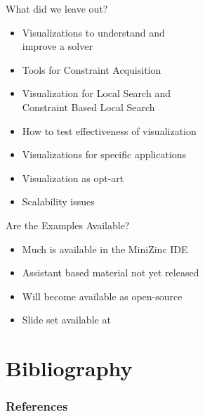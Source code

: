 \begin{frame}{What did we leave out?}
\begin{itemize}
    \item<+-|alert@+> Visualizations to understand and\\ improve a solver
    \item<+-|alert@+> Tools for Constraint Acquisition
    \item<+-|alert@+> Visualization for Local Search and\\ Constraint Based Local Search\\\cite{DBLP:journals/constraints/DoomsHM09}
    \item<+-|alert@+> How to test effectiveness of visualization
    \item<+-|alert@+> Visualizations for specific applications
    \item<+-|alert@+> Visualization as opt-art\\ \cite{DBLP:conf/cpaior/Bosch06,DBLP:journals/anor/CambazardHOO11}
    \item<+-|alert@+> Scalability issues
\end{itemize}    
\end{frame}

\begin{frame}{Are the Examples Available?}
\begin{itemize}
    \item Much is available in the MiniZinc IDE
    \item Assistant based material not yet released
    \item Will become available as open-source
    \item Slide set available at \url{}
\end{itemize}    
\end{frame}


\section{Bibliography}


\nocite{DBLP:conf/discipl/SimonisCDFNT00}
\nocite{DBLP:journals/tvcg/LiuDTGM21}
\nocite{DBLP:journals/tvcg/GoodwinMDBTW17}
\nocite{DBLP:journals/constraints/ShishmarevMTB16}
\nocite{DBLP:conf/ppdp/CameronBMM03}
\nocite{DBLP:conf/cp/Meier95}
\nocite{DBLP:conf/discipl/CarroH00}
\nocite{DBLP:conf/discipl/CarroH00a}
\nocite{DBLP:conf/agp/CarroH98}
\nocite{DBLP:conf/discipl/DeransartHM00}
\nocite{DBLP:conf/iclp/Deransart04}
\nocite{DBLP:journals/constraints/DoomsHM09}
\nocite{DBLP:conf/cpaior/LeoT17}
\nocite{DBLP:journals/constraints/FagesSC04}
\nocite{DBLP:conf/softvis/GhoniemCFJ05}

\begin{frame}[allowframebreaks]
\frametitle{References}


\end{frame}

